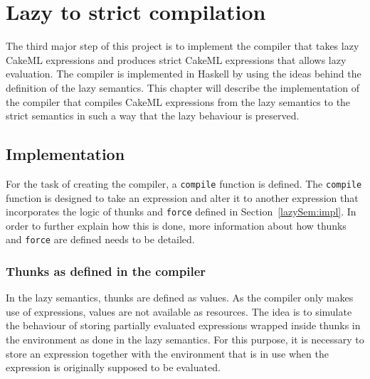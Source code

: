 \chapter{Lazy to strict compilation}
\label{chapter:compiler}
The third major step of this project is to implement the compiler that takes
lazy CakeML expressions and produces strict CakeML expressions that allows
lazy evaluation. The compiler is implemented in Haskell by using the ideas
behind the definition of the lazy semantics. This chapter will describe the
implementation of the compiler that compiles CakeML expressions from the lazy
semantics to the strict semantics in such a way that the lazy behaviour
is preserved.

\section{Implementation}

For the task of creating the compiler, a \texttt{compile} function is defined.
The \texttt{compile} function is designed to take an expression and alter it to
another expression that incorporates the logic of thunks and \texttt{force} defined in
Section~\ref{lazySem:impl}. In order to further explain how this is done,
more information about how thunks and \texttt{force} are defined needs to
be detailed.

\subsection{Thunks as defined in the compiler}
\label{comp:thunk}
In the lazy semantics, thunks are defined as values. As the compiler only makes
use of expressions, values are not available as resources.
The idea is to simulate the behaviour of storing partially evaluated expressions
wrapped inside thunks in the environment as done in the lazy semantics.
For this purpose, it is necessary to store an expression
together with the environment that is in use when the expression is originally
supposed to be evaluated.

